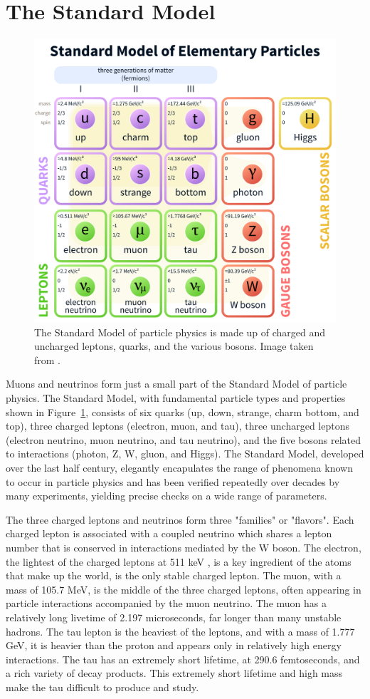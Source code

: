 \section{The Standard Model}
\label{sec:standard_model}

\begin{figure}
\centering
\includegraphics[width=0.7\linewidth]{Standard_Model_of_Elementary_Particles.png}
\caption[The Standard Model]{The Standard Model of particle physics is made up of charged and uncharged leptons, quarks, and the various bosons. Image taken from \cite{StandardModel-Image}.}
\label{fig:standard_model}
\end{figure}

Muons and neutrinos form just a small part of the Standard Model of particle physics.
The Standard Model, with fundamental particle types and properties shown in Figure~\ref{fig:standard_model}, consists of six quarks (up, down, strange, charm bottom, and top), three charged leptons (electron, muon, and tau), three uncharged leptons (electron neutrino, muon neutrino, and tau neutrino), and the five bosons related to interactions (photon, Z, W, gluon, and Higgs).
The Standard Model, developed over the last half century, elegantly encapulates the range of phenomena known to occur in particle physics and has been verified repeatedly over decades by many experiments, yielding precise checks on a wide range of parameters.

The three charged leptons and neutrinos form three "families" or "flavors". 
Each charged lepton is associated with a coupled neutrino which shares a lepton number that is conserved in interactions mediated by the W boson.
The electron, the lightest of the charged leptons at 511 keV \cite{PDG-2015}, is a key ingredient of the atoms that make up the world, is the only stable charged lepton.
The muon, with a mass of 105.7 MeV, is the middle of the three charged leptons, often appearing in particle interactions accompanied by the muon neutrino.
The muon has a relatively long livetime of 2.197 microseconds, far longer than many unstable hadrons.
The tau lepton is the heaviest of the leptons, and with a mass of 1.777 GeV, it is heavier than the proton and appears only in relatively high energy interactions.
The tau has an extremely short lifetime, at 290.6 femtoseconds, and a rich variety of decay products.
This extremely short lifetime and high mass make the tau difficult to produce and study.

